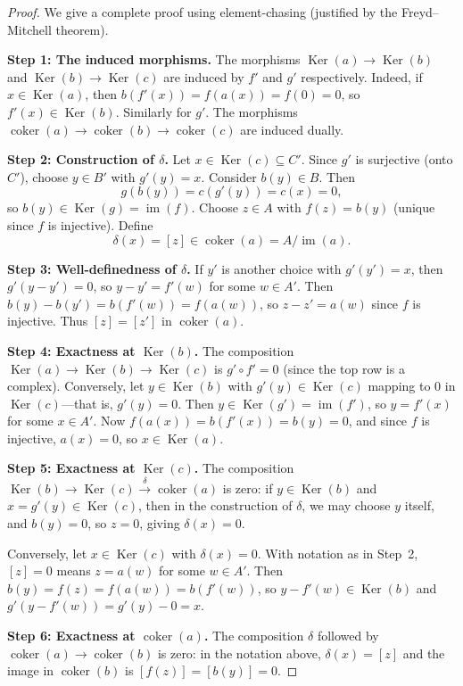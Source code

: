 \documentclass[a4paper,12pt]{book}
\DeclareMathOperator{\im}{im}
\DeclareMathOperator{\Ker}{Ker}
\DeclareMathOperator{\coker}{coker}
\theoremstyle{definition}
\theoremstyle{plain}
\theoremstyle{remark}
\begin{document}
\begin{proof}
We give a complete proof using element-chasing (justified by the Freyd--Mitchell theorem).

\medskip\noindent
\textbf{Step 1: The induced morphisms.}
The morphisms $\Ker(a) \to \Ker(b)$ and $\Ker(b) \to \Ker(c)$ are induced by $f'$ and $g'$
respectively. Indeed, if $x \in \Ker(a)$, then $b(f'(x)) = f(a(x)) = f(0) = 0$, so
$f'(x) \in \Ker(b)$. Similarly for $g'$. The morphisms $\coker(a) \to \coker(b) \to \coker(c)$
are induced dually.

\medskip\noindent
\textbf{Step 2: Construction of $\delta$.}
Let $x \in \Ker(c) \subseteq C'$. Since $g'$ is surjective (onto $C'$), choose
$y \in B'$ with $g'(y) = x$. Consider $b(y) \in B$. Then
\[
    g(b(y)) = c(g'(y)) = c(x) = 0,
\]
so $b(y) \in \Ker(g) = \im(f)$. Choose $z \in A$ with $f(z) = b(y)$ (unique since $f$
is injective). Define
\[
    \delta(x) = [z] \in \coker(a) = A / \im(a).
\]

\medskip\noindent
\textbf{Step 3: Well-definedness of $\delta$.}
If $y'$ is another choice with $g'(y') = x$, then $g'(y - y') = 0$, so $y - y' = f'(w)$
for some $w \in A'$. Then $b(y) - b(y') = b(f'(w)) = f(a(w))$, so $z - z' = a(w)$
since $f$ is injective. Thus $[z] = [z']$ in $\coker(a)$.

\medskip\noindent
\textbf{Step 4: Exactness at $\Ker(b)$.}
The composition $\Ker(a) \to \Ker(b) \to \Ker(c)$ is $g' \circ f' = 0$ (since the top
row is a complex). Conversely, let $y \in \Ker(b)$ with $g'(y) \in \Ker(c)$ mapping to $0$
in $\Ker(c)$---that is, $g'(y) = 0$. Then $y \in \Ker(g') = \im(f')$, so $y = f'(x)$
for some $x \in A'$. Now $f(a(x)) = b(f'(x)) = b(y) = 0$, and since $f$ is injective,
$a(x) = 0$, so $x \in \Ker(a)$.

\medskip\noindent
\textbf{Step 5: Exactness at $\Ker(c)$.}
The composition $\Ker(b) \to \Ker(c) \xrightarrow{\delta} \coker(a)$ is zero: if $y \in \Ker(b)$
and $x = g'(y) \in \Ker(c)$, then in the construction of $\delta$, we may choose $y$
itself, and $b(y) = 0$, so $z = 0$, giving $\delta(x) = 0$.

Conversely, let $x \in \Ker(c)$ with $\delta(x) = 0$. With notation as in Step~2,
$[z] = 0$ means $z = a(w)$ for some $w \in A'$. Then $b(y) = f(z) = f(a(w)) = b(f'(w))$,
so $y - f'(w) \in \Ker(b)$ and $g'(y - f'(w)) = g'(y) - 0 = x$.

\medskip\noindent
\textbf{Step 6: Exactness at $\coker(a)$.}
The composition $\delta$ followed by $\coker(a) \to \coker(b)$ is zero: in the
notation above, $\delta(x) = [z]$ and the image in $\coker(b)$ is $[f(z)] = [b(y)] = 0$.


\end{proof}
\end{document}
